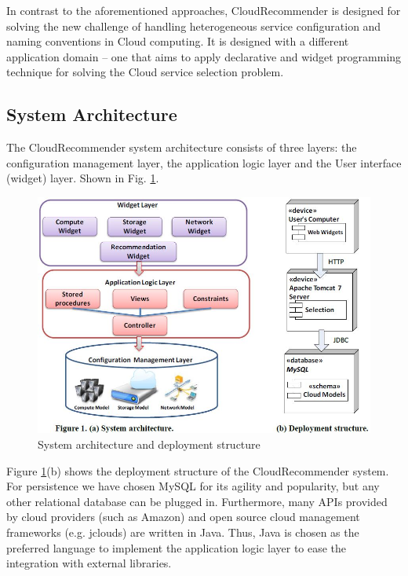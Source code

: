 In contrast to the aforementioned approaches, CloudRecommender is designed for solving the new challenge of handling heterogeneous service configuration and naming conventions in Cloud computing. It is designed with a different application domain – one that aims to apply declarative and widget programming technique for solving the Cloud service selection problem.

\subsection{System Architecture}
The CloudRecommender system architecture consists of three layers: the configuration management layer, the application logic layer and the User interface (widget) layer.
Shown in Fig. \ref{fig:SystemDeploymentStructure}.

\begin{figure}[!ht]
  \includegraphics[width=\textwidth,keepaspectratio]{Figures/system/CloudRecommender/SystemArchitecture.jpg}
  \caption{System architecture and deployment structure}
  \label{fig:SystemDeploymentStructure}
\end{figure}

Figure \ref{fig:SystemDeploymentStructure}(b) shows the deployment structure of the CloudRecommender system.
For persistence we have chosen MySQL for its agility and popularity, but any other relational database can be plugged in. 
Furthermore, many APIs provided by cloud
providers (such as Amazon) and open source cloud management frameworks (e.g.
jclouds) are written in Java. Thus, Java is chosen as the preferred language to
implement the application logic layer to ease the integration with external libraries.

